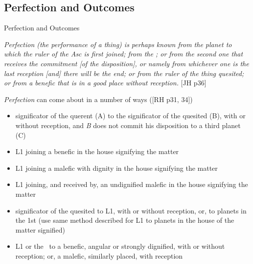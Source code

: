 \subsection{Perfection and Outcomes}
\begin{frame}[t]{Perfection and Outcomes}
\begin{block}{}
\textsl{Perfection (the performance of a thing) is perhaps known from the planet to which the ruler of the Asc is first joined; from the \Moon; or from the second one that receives the commitment [of the disposition], or namely from whichever one is the last reception [and] there will be the end; or from the ruler of the thing quesited; or from a benefic that is in a good place without reception.} [JH p36]
\end{block}
\textsl{Perfection} can come about in a number of ways ([RH p31, 34])
\small
\begin{itemize}
\item significator of the querent (A) to the significator of the quesited (B), with or without reception, and \textsl{B} does not commit his disposition to a third planet (C)
\item L1 joining a benefic in the house signifying the matter
\item L1 joining a malefic with dignity in the house signifying the matter
\item L1 joining, and received by, an undignified malefic in the house signifying the matter
\item significator of the quesited to L1, with or without reception, or, to planets in the 1st (use same method described for L1 to planets in the house of the matter signified)
\item L1 or the \Moon\ to a benefic, angular or strongly dignified, with or without reception; or, a malefic, similarly placed, with reception
\end{itemize}
\end{frame}
